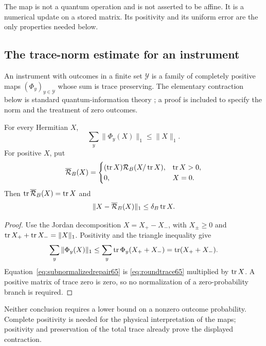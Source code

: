 The map is not a quantum operation and is not asserted to be affine.
It is a numerical update on a stored matrix. Its positivity and its
uniform error are the only properties needed below.

\subsection{The trace-norm estimate for an instrument}
An instrument with outcomes in a finite set $\mathcal Y$ is a family
of completely positive maps $(\Phi_y)_{y\in\mathcal Y}$ whose sum is
trace preserving. The elementary contraction below is standard
quantum-information theory \cite[Corollary~3.40]{Watrous65}; a proof is
included to specify the norm and the treatment of zero outcomes.

\begin{lemma}\label{lem:instrumentcontraction65}
For every Hermitian $X$,
\begin{equation}\label{eq:instrumentcontraction65}
                       \sum_y\|\Phi_y(X)\|_1\le\|X\|_1.
\end{equation}
For positive $X$, put
\[
 \overline{\mathcal R}_B(X)=
 \begin{cases}
   (\operatorname{tr} X)\mathcal R_B(X/\operatorname{tr} X),&\operatorname{tr} X>0,\\
   0,&X=0.
 \end{cases}
\]
Then $\operatorname{tr}\overline{\mathcal R}_B(X)=\operatorname{tr} X$ and
\begin{equation}\label{eq:subnormalizedrepair65}
 \|X-\overline{\mathcal R}_B(X)\|_1\le\delta_B\operatorname{tr} X.
\end{equation}
\end{lemma}
\begin{proof}
Use the Jordan decomposition $X=X_+-X_-$, with $X_\pm\ge0$ and
$\operatorname{tr} X_++\operatorname{tr} X_-=\|X\|_1$. Positivity and the triangle inequality give
\[
 \sum_y\|\Phi_y(X)\|_1
 \le\sum_y\operatorname{tr}\Phi_y(X_++X_-)=\operatorname{tr}(X_++X_-).
\]
Equation~\eqref{eq:subnormalizedrepair65} is
\eqref{eq:roundtrace65} multiplied by $\operatorname{tr} X$.
A positive matrix of trace zero is zero, so no normalization of a
zero-probability branch is required.
\end{proof}
Neither conclusion requires a lower bound on a nonzero outcome
probability. Complete positivity is needed for the physical
interpretation of the maps; positivity and preservation of the total
trace already prove the displayed contraction.

